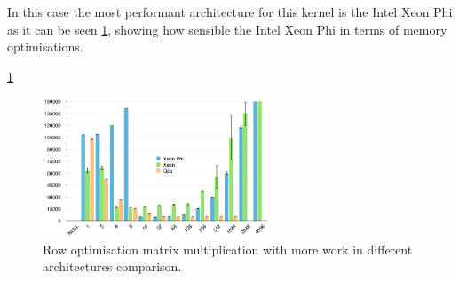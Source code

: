 \par{In this case the most performant architecture for this kernel is the Intel Xeon Phi as it can be seen \ref{RowsComp}, 
    showing how sensible the Intel Xeon Phi in terms of memory optimisations.}

\par{\ref{RowsComp}}


\begin{figure}[!h]
    \centering
    \includegraphics[width=0.6\textwidth]{figures/opt2_comp.png}
    \caption{Row optimisation matrix multiplication with more work in different architectures comparison.}
    \label{RowsComp}
\end{figure}

